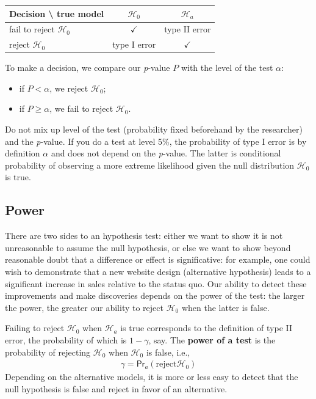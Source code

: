 \documentclass[
  11pt,
  letterpaper,
]{book}
\providecommand{\tightlist}{%
  \setlength{\itemsep}{0pt}\setlength{\parskip}{0pt}}
\theoremstyle{definition}
\theoremstyle{definition}
\theoremstyle{definition}
\theoremstyle{definition}
\theoremstyle{remark}
\begin{document}
\begin{longtable}[]{@{}lcc@{}}
\toprule()
\textbf{Decision} \textbackslash{} \textbf{true model} & \(\mathscr{H}_0\) & \(\mathscr{H}_a\) \\
\midrule()
\endhead
fail to reject \(\mathscr{H}_0\) & \(\checkmark\) & type II error \\
reject \(\mathscr{H}_0\) & type I error & \(\checkmark\) \\
\bottomrule()
\end{longtable}

To make a decision, we compare our \emph{p}-value \(P\) with the level of the test \(\alpha\):

\begin{itemize}
\tightlist
\item
  if \(P < \alpha\), we reject \(\mathscr{H}_0\);
\item
  if \(P \geq \alpha\), we fail to reject \(\mathscr{H}_0\).
\end{itemize}

Do not mix up level of the test (probability fixed beforehand by the researcher) and the \emph{p}-value. If you do a test at level 5\%, the probability of type I error is by definition \(\alpha\) and does not depend on the \emph{p}-value. The latter is conditional probability of observing a more extreme likelihood given the null distribution \(\mathscr{H}_0\) is true.

\hypertarget{power}{%
\subsection{Power}\label{power}}

There are two sides to an hypothesis test: either we want to show it is not unreasonable to assume the null hypothesis, or else we want to show beyond reasonable doubt that a difference or effect is significative: for example, one could wish to demonstrate that a new website design (alternative hypothesis) leads to a significant increase in sales relative to the status quo. Our ability to detect these improvements and make discoveries depends on the power of the test: the larger the power, the greater our ability to reject \(\mathscr{H}_0\) when the latter is false.

Failing to reject \(\mathscr{H}_0\) when \(\mathscr{H}_a\) is true corresponds to the definition of type II error, the probability of which is \(1-\gamma\), say. The \textbf{power of a test} is the probability of rejecting \(\mathscr{H}_0\) when \(\mathscr{H}_0\) is false, i.e.,
\begin{align*}
\gamma = \mathsf{Pr}_a(\text{reject} \mathscr{H}_0)
\end{align*}
Depending on the alternative models, it is more or less easy to detect that the null hypothesis is false and reject in favor of an alternative.
\end{document}
